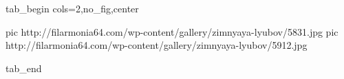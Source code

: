  
 
 
 
 


\ifcmt
  tab_begin cols=2,no_fig,center

     pic http://filarmonia64.com/wp-content/gallery/zimnyaya-lyubov/5831.jpg
		 pic http://filarmonia64.com/wp-content/gallery/zimnyaya-lyubov/5912.jpg

  tab_end
\fi
